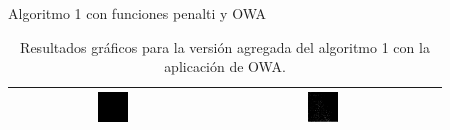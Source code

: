 \documentclass{beamer}
\theoremstyle{plain} %
\theoremstyle{definition}
\begin{document}
\begin{frame}{Algoritmo 1 con funciones penalti y OWA}
\begin{table}
\begin{tabular}{c|c|c}
  \includegraphics[width=0.15\textwidth]{img/res/e6/alg1agregadoowa209.jpg} &
  \includegraphics[width=0.15\textwidth]{img/res/e6/alg1agregadoowa309.jpg} \\\hline
  \end{tabular}
  \caption{Resultados gráficos para la versión agregada del algoritmo 1 con la aplicación de OWA. \label{tab:resultexp6imagenes}}
  \end{table}
\end{frame}
\end{document}
